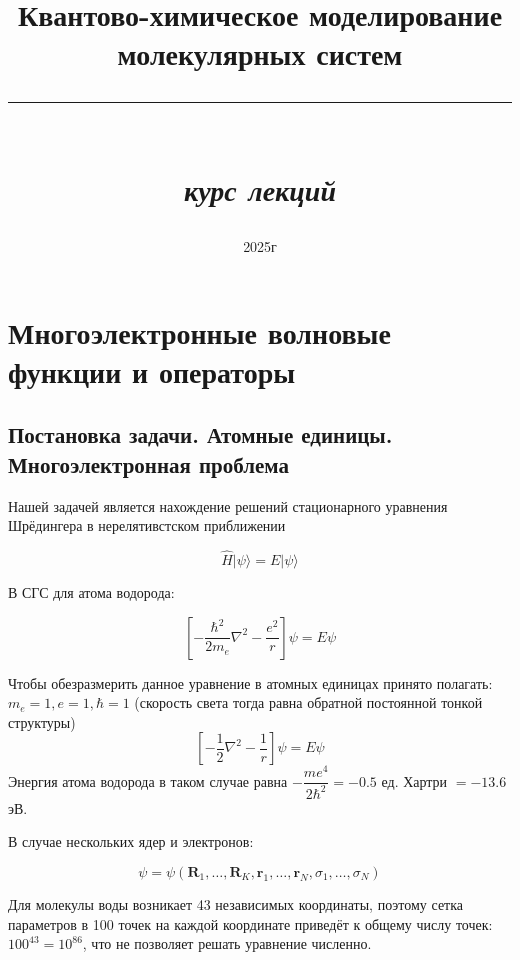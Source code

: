 \documentclass[12pt, oneside]{article}
\title{\huge Квантово-химическое моделирование молекулярных систем\\ \rule{0.8\textwidth}{0.4pt} \\ \large \textit{курс лекций}}
\date{2025г}
\numberwithin{equation}{section}  %
\begin{document}
\maketitle
\tableofcontents

\vspace{.25in}

\section{Многоэлектронные волновые функции и операторы}

\subsection{Постановка задачи. Атомные единицы. Многоэлектронная проблема}


\hspace{0.4cm} Нашей задачей является нахождение решений стационарного уравнения Шрёдингера в нерелятивстском приближении

\begin{equation}
    \hat{H} |\psi \rangle = E | \psi \rangle
    \label{eq:Shr}
\end{equation}

В СГС для атома водорода:

\begin{equation}
    \left[ - \dfrac{\hbar^2}{2 m_e} \nabla^2 - \dfrac{e^2}{r}\right] \psi = E \psi
\end{equation}


Чтобы обезразмерить данное уравнение в атомных единицах принято полагать: \(m_e = 1, e = 1, \hbar = 1\) (скорость света тогда равна обратной постоянной тонкой структуры)
\begin{equation}
    \left[- \dfrac{1}{2} \nabla^2 - \dfrac{1}{r} \right] \psi = E \psi
\end{equation}
Энергия атома водорода в таком случае равна \(- \dfrac{m e^4}{2 \hbar^2} = - 0.5\) ед. Хартри \( = -13.6\) эВ.

В случае нескольких ядер и электронов:

\begin{equation}
    \psi = \psi(\bm{R}_1, \dots, \bm{R}_K, \bm{r}_1, \dots, \bm{r}_N, \sigma_1, \dots, \sigma_N)
\end{equation}


Для молекулы воды возникает 43 независимых координаты, поэтому сетка параметров в 100 точек на каждой координате приведёт к общему числу точек: \(100^{43} = 10^{86}\), что не позволяет решать уравнение численно.
\end{document}
